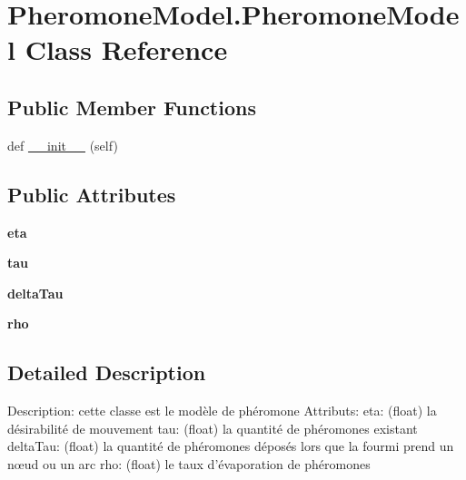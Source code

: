 \hypertarget{class_pheromone_model_1_1_pheromone_model}{}\section{Pheromone\+Model.\+Pheromone\+Model Class Reference}
\label{class_pheromone_model_1_1_pheromone_model}
\subsection*{Public Member Functions}
\begin{DoxyCompactItemize}
\item 
def \mbox{\hyperlink{class_pheromone_model_1_1_pheromone_model_a7d692c818254359644c81f058dc89ba0}{\+\_\+\+\_\+init\+\_\+\+\_\+}} (self)
\end{DoxyCompactItemize}
\subsection*{Public Attributes}
\begin{DoxyCompactItemize}
\item 
\mbox{\label{class_pheromone_model_1_1_pheromone_model_ad9abf0a724e3e5dfd06abb3c74cf15d5}} 
{\bfseries eta}
\item 
\mbox{\label{class_pheromone_model_1_1_pheromone_model_a2d2e77f8db0cb747d32f2889eac15fef}} 
{\bfseries tau}
\item 
\mbox{\label{class_pheromone_model_1_1_pheromone_model_ac660c2c6a81ad79fbb577de1f8ae6563}} 
{\bfseries delta\+Tau}
\item 
\mbox{\label{class_pheromone_model_1_1_pheromone_model_acd496c31c606a05fafdcaa16267fa3d5}} 
{\bfseries rho}
\end{DoxyCompactItemize}


\subsection{Detailed Description}
\begin{DoxyVerb}Description: cette classe est le modèle de phéromone
Attributs:
    eta: (float) la désirabilité de mouvement
    tau: (float) la quantité de phéromones existant
    deltaTau: (float) la quantité de phéromones déposés lors que la fourmi prend un nœud ou un arc
    rho: (float) le taux d'évaporation de phéromones
\end{DoxyVerb}
 

